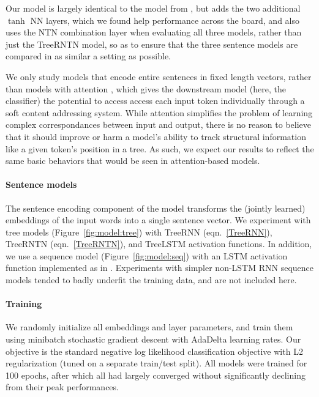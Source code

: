Our model is largely identical to the model from , but adds the two additional $\tanh$ NN layers, which we found help performance across the board, and also uses the NTN combination layer when evaluating all three models, rather than just the TreeRNTN model, so as to ensure that the three sentence models are compared in as similar a setting as possible.

We only study models that encode entire sentences in fixed length vectors, rather than models with attention \cite{bahdanau2014neural}, which gives the downstream model (here, the classifier) the potential to access access each input token individually through a soft content addressing system. While attention simplifies the problem of learning complex correspondances between input and output, there is no reason to believe that it should improve or harm a model's ability to track structural information like a given token's position in a tree. As such, we expect our results to reflect the same basic behaviors that would be seen in attention-based models.

\paragraph{Sentence models}
The sentence encoding component of the model transforms the (jointly learned) embeddings of the input words into a single sentence vector. We experiment with tree models (Figure~\ref{fig:model:tree}) with TreeRNN (eqn.~\ref{TreeRNN}), TreeRNTN (eqn.~\ref{TreeRNTN}), and TreeLSTM \cite{tai2015improved} activation functions. In addition, we use a sequence model (Figure~\ref{fig:model:seq}) with an LSTM activation function \cite{hochreiter1997long} implemented as in . Experiments with simpler non-LSTM RNN sequence models tended to badly underfit the training data, and are not included here.

\paragraph{Training} We randomly initialize all embeddings and layer parameters, and train them using minibatch stochastic gradient descent with AdaDelta \cite{zeiler2012adadelta} learning rates. Our objective is the standard negative log likelihood classification objective with L2 regularization (tuned on a separate train/test split). All models were trained for 100 epochs, after which all had largely converged without significantly declining from their peak performances.
